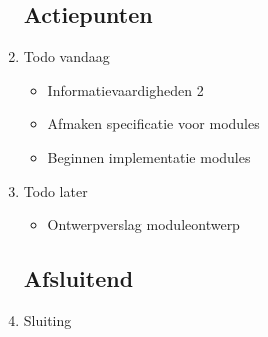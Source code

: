 \documentclass{article}
\begin{document}
\begin{enumerate}
	\subsection*{Actiepunten}
	\item Todo vandaag
	\begin{itemize}
		\item Informatievaardigheden 2
		\item Afmaken specificatie voor modules
		\item Beginnen implementatie modules
	\end{itemize}
	\item Todo later
	\begin{itemize}
		\item Ontwerpverslag moduleontwerp
	\end{itemize}

	\noindent 
	\subsection*{Afsluitend}
	\item Sluiting

\end{enumerate}
\end{document}
